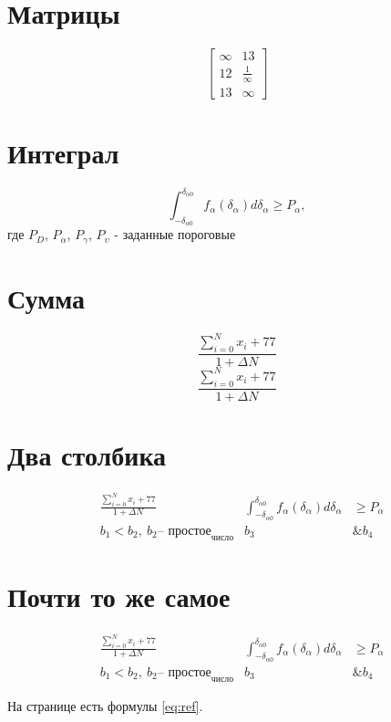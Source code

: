 \documentclass[a4paper, 12pt]{article}
\begin{document}
\graphicspath{{images/}{images2/}} %

\author{М.А.Гейне}
\bmstutitlelab

\hypersetup{
    linkcolor=black
}

\section{Матрицы}
\[ \begin{bmatrix}
    \infty & 13 \\
    12 & \frac{1}{\infty} \\
    13 & \infty
\end{bmatrix} \]

\section{Интеграл}
\[ \int^{\delta_{\alpha0}}_{-\delta_{\alpha0}}f_{\alpha}(\delta_\alpha)d\delta_\alpha \geqslant P_\alpha,\]
где $P_D$, $P_\alpha$, $P_\gamma$, $P_\upsilon $ - заданные пороговые

\section{Сумма}

\[ \frac{\sum^N_{i=0}x_i + 77}{1 + \Delta N} \]
\[ \frac{\displaystyle\sum^N_{i=0}x_i + 77}{1 + \Delta N} \]

\section{Два столбика}

\begin{align}
    &\frac{\displaystyle\sum^N_{i=0}x_i + 77}{1 + \Delta N} & 
    \int^{\delta_{\alpha0}}_{-\delta_{\alpha0}}f_{\alpha}(\delta_\alpha)d\delta_\alpha &\geqslant P_\alpha \\
    &b_1 < b_2,~ b_2 \text{-- простое}_\text{число} &
    b_3&\& b_4
\end{align}


\section{Почти то же самое}

\begin{equation}\label{eq:ref}
    \begin{aligned}
        &\frac{\sum^N_{i=0}x_i + 77}{1 + \Delta N} & 
        \int^{\delta_{\alpha0}}_{-\delta_{\alpha0}}f_{\alpha}(\delta_\alpha)d\delta_\alpha &\geqslant P_\alpha \\
        &b_1 < b_2,~ b_2 \text{-- простое}_\text{число} &
        b_3&\&b_4
    \end{aligned}
\end{equation}

На странице \pageref{eq:ref} есть формулы \eqref{eq:ref}.
\end{document}
